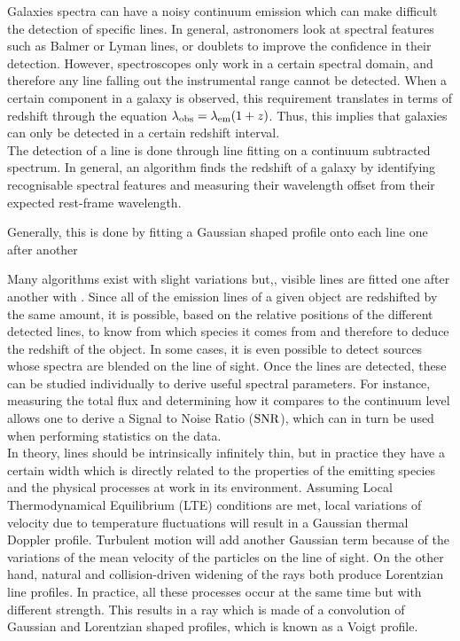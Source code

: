 Galaxies spectra can have a noisy continuum emission which can make difficult the detection of specific lines. In general, astronomers look at spectral features such as Balmer or Lyman lines, or doublets to improve the confidence in their detection. However, spectroscopes only work in a certain spectral domain, and therefore any line falling out the instrumental range cannot be detected. When a certain component in a galaxy is observed, this requirement translates in terms of redshift through the equation $\lambda_{\rm{obs}} = \lambda_{\rm{em}} ( 1+ z)$. Thus, this implies that galaxies can only be detected in a certain redshift interval. \\

The detection of a line is done through line fitting on a continuum subtracted spectrum. In general, an algorithm finds the redshift of a galaxy by identifying recognisable spectral features and measuring their wavelength offset from their expected rest-frame wavelength. 

Generally, this is done by fitting a Gaussian shaped profile onto each line one after another

Many algorithms exist with slight variations but,, visible lines are fitted one after another with . Since all of the emission lines of a given object are redshifted by the same amount, it is possible, based on the relative positions of the different detected lines, to know from which species it comes from and therefore to deduce the redshift of the object. In some cases, it is even possible to detect sources whose spectra are blended on the line of sight. Once the lines are detected, these can be studied individually to derive useful spectral parameters. For instance, measuring the total flux and determining how it compares to the continuum level allows one to derive a Signal to Noise Ratio ($\rm{SNR}$), which can in turn be used when performing statistics on the data. \\

In theory, lines should be intrinsically infinitely thin, but in practice they have a certain width which is directly related to the properties of the emitting species and the physical processes at work in its environment. Assuming Local Thermodynamical Equilibrium (LTE) conditions are met, local variations of velocity due to temperature fluctuations will result in a Gaussian thermal Doppler profile. Turbulent motion will add another Gaussian term because of the variations of the mean velocity of the particles on the line of sight. On the other hand, natural and collision-driven widening of the rays both produce Lorentzian line profiles. In practice, all these processes occur at the same time but with different strength. This results in a ray which is made of a convolution of Gaussian and Lorentzian shaped profiles, which is known as a Voigt profile. \\

